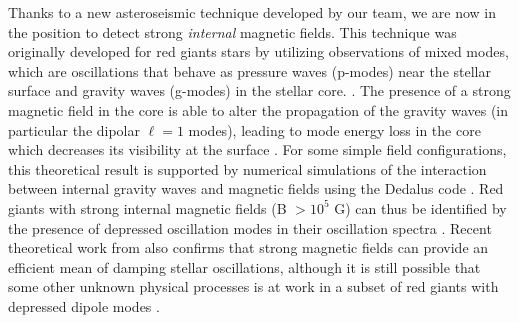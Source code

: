 Thanks to a new asteroseismic technique developed by our team, we are now in the position to detect strong {\it internal} magnetic fields. This technique was originally developed for red giants stars by utilizing observations of mixed modes, which are oscillations that behave as pressure waves (p-modes) near the stellar surface and gravity waves (g-modes) in the stellar core.  \citep[e.g][]{Beck_2011}. The presence of a strong magnetic field in the core is able to alter the propagation of the gravity waves (in particular the dipolar $\ell =1$ modes),
leading to mode energy loss in the core which decreases its visibility at the surface \citep{Fuller_2015}. For some simple field configurations, this theoretical result is supported  by numerical simulations of the interaction between internal gravity waves and magnetic fields using the Dedalus code \citep{Lecoanet_2016}. Red giants with strong internal magnetic fields (B $> 10^5$ G) can thus be identified by the presence of depressed oscillation modes in their oscillation spectra \citep{Fuller_2015,Stello_2016}. Recent theoretical work from \citet{2017MNRAS.467.3212L} also confirms that  strong magnetic fields can provide an efficient mean of damping stellar oscillations, although it is still possible that some other unknown physical processes is at work in a subset of red giants with depressed dipole modes \citet{Mosser_2017}.
